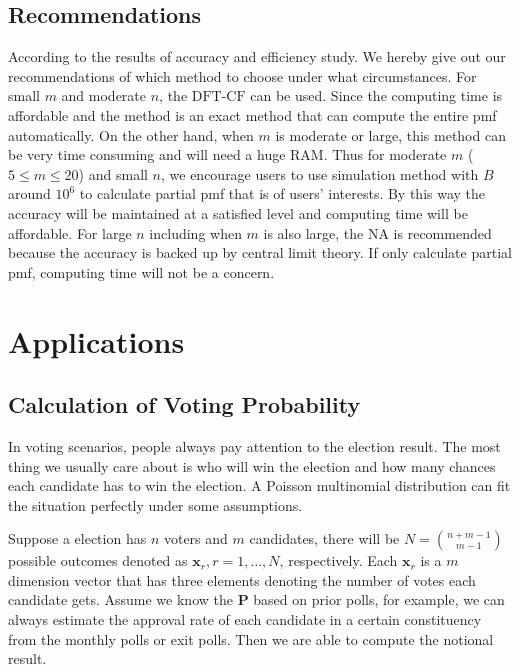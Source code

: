 \documentclass[12pt]{article}
\newcommand{\Pmat}{\mathbf{P}}
\newcommand{\xvec}{\boldsymbol{x}}
\newcommand{\NA}{{\textrm{NA}}}
\newcommand{\dft}{{\textrm{DFT-CF}}}
\begin{document}
\subsection{Recommendations}
According to the results of accuracy and efficiency study. We hereby give out our recommendations of which method to choose under what circumstances. For small $m$ and moderate $n$, the $\dft$ can be used. Since the computing time is affordable and the method is an exact method that can compute the entire pmf automatically. On the other hand, when $m$ is moderate or large, this method can be very time consuming and will need a huge RAM. Thus for moderate $m$ ($5 \leq m \leq 20$) and small $n$, we encourage users to use simulation method with $B$ around $10^6$ to calculate partial pmf that is of users' interests. By this way the accuracy will be maintained at a satisfied level and computing time will be affordable. For large $n$ including when $m$ is also large, the $\NA$ is recommended because the accuracy is backed up by central limit theory. If only calculate partial pmf, computing time will not be a concern.

\section{Applications}\label{sec:applications}
\subsection{Calculation of Voting Probability}
In voting scenarios, people always pay attention to the election result. The most thing we usually care about is who will win the election and how many chances each candidate has to win the election. A Poisson multinomial distribution can fit the situation perfectly under some assumptions.

Suppose a election has $n$ voters and $m$ candidates, there will be $N = \binom{n+m-1}{m-1}$ possible outcomes denoted as $\xvec_r, r = 1, \dots, N$, respectively. Each $\xvec_r$ is a $m$ dimension vector that has three elements denoting the number of votes each candidate gets. Assume we know the $\Pmat$ based on prior polls, for example, we can always estimate the approval rate of each candidate in a certain constituency from the monthly polls or exit polls. Then we are able to compute the notional result.
\end{document}
